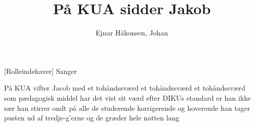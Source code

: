 \documentclass[a4paper,11pt]{article}
\title{På KUA sidder Jakob}
\author{Ejnar Håkonsen, Johan}
\begin{document}
\maketitle

\begin{roles}  
[Rolleindehaver] Sanger
\end{roles}

\begin{song}
   På KUA vifter Jacob med et tohåndssværd
et tohåndssværd
et tohåndssværd
som pædagogisk middel har det vist sit værd
efter DIKUs standard er han ikke sær
han stirrer ondt på alle de studerende
korrigerende
og hoverende
han tager pusten ud af tredje-g'erne
og de græder hele natten lang
\end{song}
\end{document}
